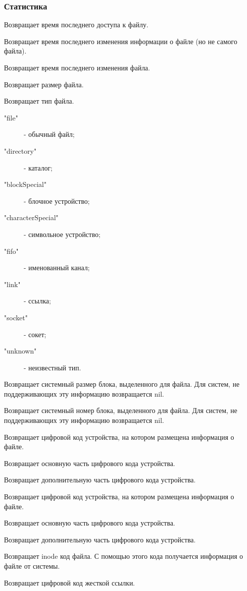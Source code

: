 \subsubsection*{Статистика}

\begin{methodlist}
  Возвращает время последнего доступа к файлу. 

  Возвращает время последнего изменения информации о файле (но не самого файла).

  Возвращает время последнего изменения файла.

  Возвращает размер файла.

  Возвращает тип файла. 
  \begin{description}
    \item["file"] - обычный файл; 
    \item["directory"] - каталог; 
    \item["blockSpecial"] - блочное устройство; 
    \item["characterSpecial"] - символьное устройство; 
    \item["fifo"] - именованный канал; 
    \item["link"] - ссылка; 
    \item["socket"] - сокет; 
    \item["unknown"] - неизвестный тип.
  \end{description}

  Возвращает системный размер блока, выделенного для файла. Для систем, не поддерживающих эту информацию возвращается nil. 
 
  Возвращает системный номер блока, выделенного для файла. Для систем, не поддерживающих эту информацию возвращается nil. 
 
  Возвращает цифровой код устройства, на котором размещена информация о файле. 
 
  Возвращает основную часть цифрового кода устройства. 
 
  Возвращает дополнительную часть цифрового кода устройства. 
 
  Возвращает цифровой код устройства, на котором размещена информация о файле. 
 
  Возвращает основную часть цифрового кода устройства. 
 
  Возвращает дополнительную часть цифрового кода устройства. 
 
  Возвращает inode код файла. С помощью этого кода получается информация о файле от системы.

  Возвращает цифровой код жесткой ссылки.
\end{methodlist}

